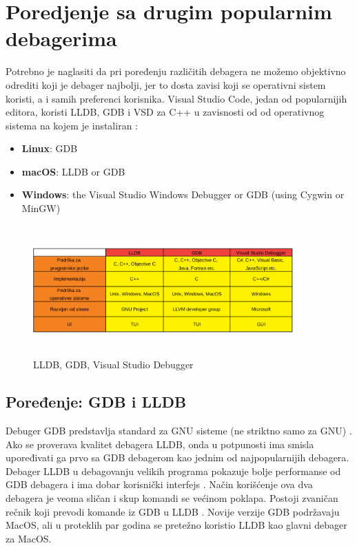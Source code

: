 \documentclass[a4paper]{article}
\begin{document}
\section{Poredjenje sa drugim popularnim debagerima}
\label{sec:naslovN}

Potrebno je naglasiti da pri poređenju različitih debagera ne možemo objektivno odrediti koji je debager najbolji, jer to dosta zavisi koji se operativni sistem koristi, a i samih preferenci korisnika. Visual Studio Code, jedan od popularnijih editora, koristi LLDB, GDB i VSD za C++ u zavisnosti od od operativnog sistema na kojem je instaliran \cite{vsc_support}:
\begin{itemize}
	\item \textbf{Linux}: GDB
	\item \textbf{macOS}: LLDB or GDB
	\item \textbf{Windows}: the Visual Studio Windows Debugger or GDB (using Cygwin or MinGW)
\end{itemize}

\begin{figure}[h!]
	\begin{center}
		\includegraphics[width=100mm,height=50mm]{Slike/tabela_poredjenje1.png}
	\end{center}
	\caption{LLDB, GDB, Visual Studio Debugger \cite{gdb}\cite{lldb}\cite{vsd}}
	\label{fig:tabela_poredjenje1}
\end{figure}

\subsection{Poređenje: GDB i LLDB}
\label{subsec: GDB i LLDB}

Debuger GDB predstavlja standard za GNU sisteme (ne striktno samo za GNU) \cite{gdb}. Ako se proverava kvalitet debagera LLDB, onda u potpunosti ima smisla upoređivati ga prvo sa GDB debagerom kao jednim od najpopularnijih debagera. Debager LLDB u debagovanju velikih programa pokazuje bolje performanse od GDB debagera i ima dobar korisnički interfejs \cite{lldb_project_blog}. Način korišćenje ova dva debagera je veoma sličan i skup komandi se većinom poklapa. Postoji zvaničan rečnik koji prevodi komande iz GDB u LLDB \cite {lldb_to_gdb_map}. Novije verzije GDB podržavaju MacOS, ali u proteklih par godina se pretežno koristio LLDB kao glavni debager za MacOS.
\end{document}

